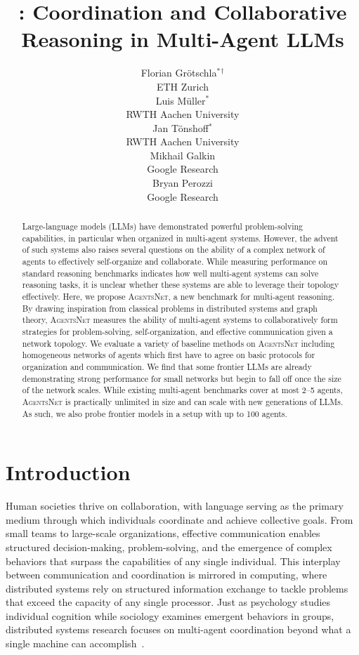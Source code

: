 \documentclass{article}
\title{\benchmark{}: Coordination and Collaborative Reasoning in Multi-Agent LLMs}
\author{%
  Florian Grötschla$^*$$^\dagger$ \\
  ETH Zurich\\
  \And
  Luis Müller$^*$ \\
  RWTH Aachen University\\
  \And
  Jan Tönshoff$^*$ \\
  RWTH Aachen University\\
  \AND
  Mikhail Galkin \\
  Google Research\\
  \And
  Bryan Perozzi \\
  Google Research\\
}
\newcommand{\benchmark}{\textsc{AgentsNet}}
\begin{document}
\maketitle

\begin{abstract}
Large-language models (LLMs) have demonstrated powerful problem-solving capabilities, in particular when organized in multi-agent systems. However, the advent of such systems also raises several questions on the ability of a complex network of agents to effectively self-organize and collaborate. While measuring performance on standard reasoning benchmarks indicates how well multi-agent systems can solve reasoning tasks, it is unclear whether these systems are able to leverage their topology effectively. Here, we propose \benchmark{}, a new benchmark for multi-agent reasoning. By drawing inspiration from classical problems in distributed systems and graph theory, \benchmark{} measures the ability of multi-agent systems to collaboratively form strategies for problem-solving, self-organization, and effective communication given a network topology. We evaluate a variety of baseline methods on \benchmark{} including
homogeneous networks of agents which first have to agree on basic protocols for organization and communication. 
We find that some frontier LLMs are already demonstrating strong performance for small networks but begin to fall off once the size of the network scales. 
While existing multi-agent benchmarks cover at most 2--5 agents, \benchmark{} is practically unlimited in size and can scale with new generations of LLMs.
As such, we also probe frontier models in a setup with up to 100 agents.
\end{abstract}


\section{Introduction} \label{sec:introduction}
Human societies thrive on collaboration, with language serving as the primary medium through which individuals coordinate and achieve collective goals. From small teams to large-scale organizations, effective communication enables structured decision-making, problem-solving, and the emergence of complex behaviors that surpass the capabilities of any single individual. This interplay between communication and coordination is mirrored in computing, where distributed systems rely on structured information exchange to tackle problems that exceed the capacity of any single processor. Just as psychology studies individual cognition while sociology examines emergent behaviors in groups, distributed systems research focuses on multi-agent coordination beyond what a single machine can accomplish~\citep{lenzen2012distributed}.
\end{document}
